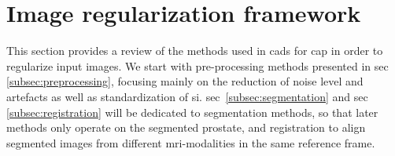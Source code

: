 \section{Image regularization framework} \label{sec:imaprocfra}

This section provides a review of the methods used in \acp{cad} for \ac{cap} in order to regularize input images. We start with pre-processing methods presented in \ac{sec}\,\ref{subsec:preprocessing}, focusing mainly on the reduction of noise level and artefacts as well as standardization of \ac{si}. \Acl{sec}~\ref{subsec:segmentation} and \ac{sec}\,\ref{subsec:registration} will be dedicated to segmentation methods, so that later methods only operate on the segmented prostate, and registration to align segmented images from different \ac{mri}-modalities in the same reference frame.







